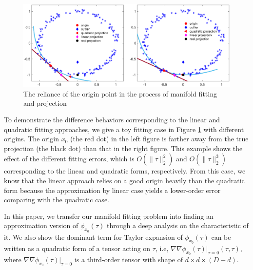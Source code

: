 \documentclass{article}
\theoremstyle{remark}
\begin{document}
\begin{figure}[t!] %
   \centering
   \includegraphics[width=\linewidth]{democ3.eps} 
   \caption{The reliance of the origin point in the process of manifold fitting and projection}
   \label{Comparison}
\end{figure}
To demonstrate the difference behaviors corresponding to the linear and quadratic fitting approaches, we give a toy fitting case in Figure \ref{Comparison} with different origins. The origin $x_0$ (the red dot) in the left figure is farther away from the true projection (the black dot) than that in the right figure.  This example shows the effect of the different fitting errors, which is $O(\|\tau\|_2^2)$ and $O(\|\tau\|_2^3)$ corresponding to the linear and quadratic forms, respectively. From this case, we know that the linear approach relies on a good origin heavily than the quadratic form because the approximation by linear case yields a lower-order error comparing with the quadratic case.
 

In this paper, we transfer our manifold fitting problem into finding an approximation version of $\phi_{x_0}(\tau)$ through a deep analysis on the characteristic of it. We also show the dominant term for Taylor expansion of $\phi_{x_0}(\tau)$ can be written as a quadratic form of a tensor acting on $\tau$, i.e, $\nabla\nabla \phi_{x_0}(\tau)|_{\tau=0}(\tau,\tau)$, where $\nabla\nabla\phi_{x_0}(\tau)|_{\tau=0}$ is a third-order tensor with shape of $d\times d\times (D-d)$.  
\end{document}
